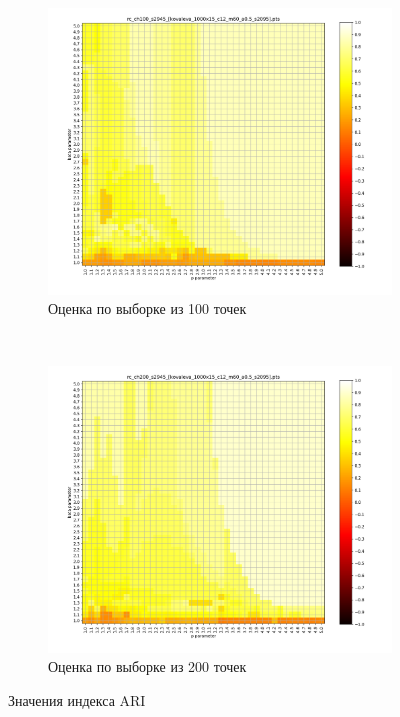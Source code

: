 \documentclass[12pt,twoside,a4paper,tikz,border=5]{refart}
\begin{document}
\begin{figure}[t!]
		\begin{subfigure}[t]{0.5\textwidth}
			\centering
			\includegraphics[width=1\linewidth, trim=1.4cm 1cm 2cm 0.5cm, clip]{img/ari/12/kovaleva_1000x15_c12_m60_a0.5_s2095/100/rc_ch100_s2945_[kovaleva_1000x15_c12_m60_a0.5_s2095].png}
			\caption{Оценка по выборке из 100 точек} \label{fig:ari-100}
		\end{subfigure}%
		~
		\begin{subfigure}[t]{0.5\textwidth}
			\centering
			\includegraphics[width=1\linewidth, trim=1.4cm 1cm 2cm 0.5cm, clip]{img/ari/12/kovaleva_1000x15_c12_m60_a0.5_s2095/200/rc_ch200_s2945_[kovaleva_1000x15_c12_m60_a0.5_s2095].png}
			\caption{Оценка по выборке из 200 точек} \label{fig:ari-200}
		\end{subfigure}
		\caption{Значения индекса ARI} \label{fig:ari}
	\end{figure}
			
\end{document}
